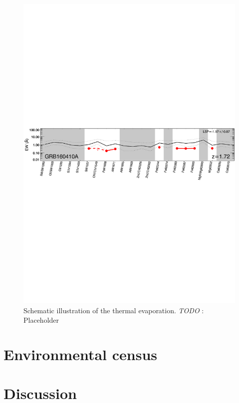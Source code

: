 \documentclass[a4paper,fleqn,usenatbib]{mnras}
\newcommand{\todo}[3]{{\color{#2}\emph{#1}: #3}}
\newcommand{\jtodo}[1]{\todo{TODO }{red}{#1}}
\begin{document}
\begin{figure}
	\includegraphics[width=\columnwidth]{figures/160410Alines.pdf}
	\caption{Schematic illustration of the thermal evaporation. \jtodo{Placeholder}}
	\label{fig:example_figure}
\end{figure}




\section{Environmental census}


\section{Discussion}
\end{document}
